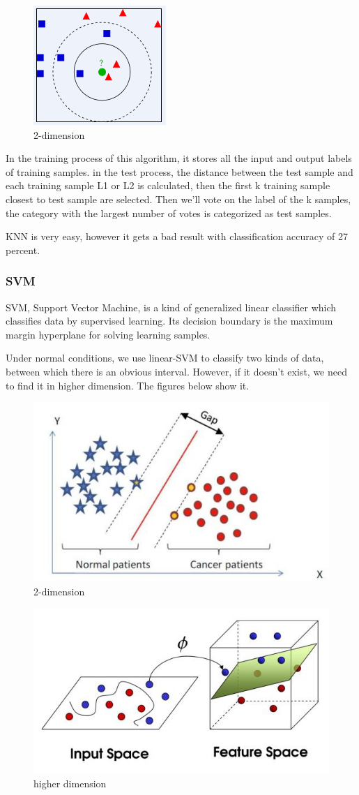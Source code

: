 \documentclass{article} %
\begin{document}
\begin{figure}[h]
	\centering  %
	\includegraphics[width=.4\textwidth]{5.png} 
	\caption{2-dimension}  %
	\label{fig:f5}   %
\end{figure}
In the training process of this algorithm, it stores all the input and output labels of training samples. in the test process, the distance between the test sample and each training sample L1 or L2 is calculated, then the first k training sample closest to test sample are selected. Then we'll vote on the label of the k samples, the category with the largest number of votes is categorized as test samples.

KNN is very easy, however it gets a bad result with classification accuracy of 27 percent. 

\subsubsection{SVM}
SVM, Support Vector Machine, is a kind of generalized linear classifier which classifies data by supervised learning. Its decision boundary is the maximum margin hyperplane for solving learning samples.

Under normal conditions, we use linear-SVM to classify two kinds of data, between which there is an obvious interval. However, if it doesn't exist, we need to find it in higher dimension. The figures below show it.

\begin{figure}[h]
	\centering  %
	\includegraphics[width=.4\textwidth]{1.jpg} 
	\caption{2-dimension}  %
	\label{fig:f1}   %
\end{figure}
\begin{figure}[h]
	\centering  %
	\includegraphics[width=.4\textwidth]{2.jpg}
	\caption{higher dimension}  %
	\label{fig:f2}   %
\end{figure}	
\end{document}
